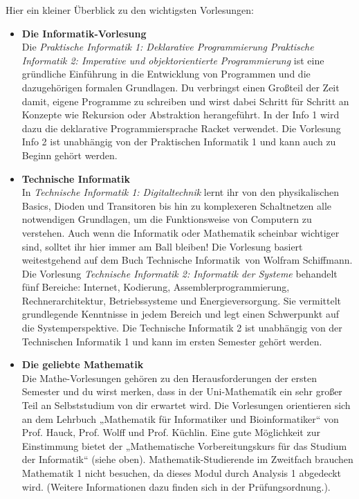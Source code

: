 \ifbachelor
{}
Hier ein kleiner Überblick zu den wichtigsten Vorlesungen:
\begin{itemize}
	\item
	\textbf{Die Informatik-Vorlesung} \\
	Die
	\ifwintersemester \emph{Praktische Informatik 1: Deklarative Programmierung} \fi
	\ifsommersemester \emph{Praktische Informatik 2: Imperative und objektorientierte Programmierung} \fi
	ist eine gründliche Einführung in die Entwicklung von Programmen und die dazugehörigen formalen Grundlagen.
	Du verbringst einen Großteil der Zeit damit, eigene Programme zu schreiben und wirst dabei Schritt für Schritt
	an Konzepte wie Rekursion oder Abstraktion herangeführt.
	\ifwintersemester In der Info 1 wird dazu die deklarative Programmiersprache Racket verwendet. \fi
	\ifsommersemester Die Vorlesung Info 2 ist unabhängig von der Praktischen Informatik 1 und kann auch zu Beginn gehört werden. \fi

	\ifinfo
	\item
	\textbf{Technische Informatik} \\
	\ifwintersemester
	In \emph{Technische Informatik 1: Digitaltechnik} lernt ihr von den physikalischen Basics, Dioden und Transitoren bis hin zu komplexeren Schaltnetzen alle notwendigen Grundlagen,
	um die Funktionsweise von Computern zu verstehen. Auch wenn die Informatik oder Mathematik scheinbar wichtiger sind, solltet ihr hier immer am Ball bleiben!
	Die Vorlesung basiert weitestgehend auf dem Buch \glqq Technische Informatik\grqq \ von Wolfram Schiffmann.
	\fi
	\ifsommersemester
	Die Vorlesung \emph{Technische Informatik 2: Informatik der Systeme} behandelt fünf Bereiche: Internet, Kodierung, Assemblerprogrammierung, Rechnerarchitektur, Betriebssysteme
	und Energieversorgung. Sie vermittelt grundlegende Kenntnisse in jedem Bereich und legt einen Schwerpunkt auf die Systemperspektive. Die Technische Informatik 2 ist unabhängig von
	der Technischen Informatik 1 und kann im ersten Semester gehört werden.
	\fi
	\fi

	\item
	\textbf{Die geliebte Mathematik} \\
	Die Mathe-Vorlesungen gehören zu den Herausforderungen der ersten Semester und du wirst merken, dass in der Uni-Mathematik ein sehr großer Teil an Selbststudium von dir erwartet wird.
	Die Vorlesungen orientieren sich an dem Lehrbuch „Mathematik für Informatiker und Bioinformatiker“ von Prof. Hauck, Prof. Wolff und Prof. Küchlin. Eine gute Möglichkeit zur
	Einstimmung bietet der „Mathematische Vorbereitungskurs für das Studium der Informatik“ (siehe oben).
	\iflehramt
	Mathematik-Studierende im Zweitfach brauchen Mathematik 1 nicht besuchen, da dieses Modul durch Analysis 1 abgedeckt wird. 
	(Weitere Informationen dazu finden sich in der Prüfungsordnung.).
	\fi
\end{itemize}
\fi

